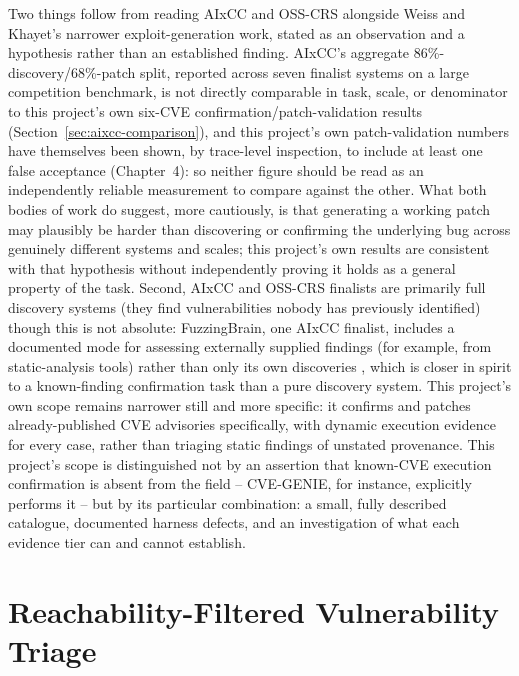 \documentclass[12pt,a4paper]{report}
\begin{document}
Two things follow from reading AIxCC and OSS-CRS alongside Weiss and Khayet's narrower exploit-generation work, stated as an observation and a hypothesis rather than an established finding. AIxCC's aggregate 86\%-discovery/68\%-patch split, reported across seven finalist systems on a large competition benchmark, is not directly comparable in task, scale, or denominator to this project's own six-CVE confirmation/patch-validation results (Section~\ref{sec:aixcc-comparison}), and this project's own patch-validation numbers have themselves been shown, by trace-level inspection, to include at least one false acceptance (Chapter~4): so neither figure should be read as an independently reliable measurement to compare against the other. What both bodies of work do suggest, more cautiously, is that generating a working patch may plausibly be harder than discovering or confirming the underlying bug across genuinely different systems and scales; this project's own results are consistent with that hypothesis without independently proving it holds as a general property of the task. Second, AIxCC and OSS-CRS finalists are primarily full discovery systems (they find vulnerabilities nobody has previously identified) though this is not absolute: FuzzingBrain, one AIxCC finalist, includes a documented mode for assessing externally supplied findings (for example, from static-analysis tools) rather than only its own discoveries \cite{fuzzingbrain}, which is closer in spirit to a known-finding confirmation task than a pure discovery system. This project's own scope remains narrower still and more specific: it confirms and patches already-published CVE advisories specifically, with dynamic execution evidence for every case, rather than triaging static findings of unstated provenance. This project's scope is distinguished not by an assertion that known-CVE execution confirmation is absent from the field -- CVE-GENIE, for instance, explicitly performs it -- but by its particular combination: a small, fully described catalogue, documented harness defects, and an investigation of what each evidence tier can and cannot establish.

\section{Reachability-Filtered Vulnerability Triage}
\end{document}
